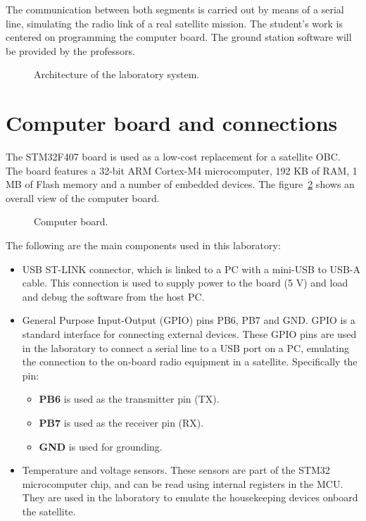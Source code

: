 The communication between both segments is carried out by means of a serial line,
simulating the radio link of a real satellite mission.
The student's work is centered on programming the computer board.
The ground station software will be provided by the professors.

\begin{figure}[hbtp!]
            \caption{Architecture of the laboratory system.}
            \label{fig:architecture}
\end{figure}

\section*{Computer board and connections}

The STM32F407 board is used as a low-cost replacement for a satellite OBC.
The board features a 32-bit ARM Cortex-M4 microcomputer,
192 KB of RAM, 1 MB of Flash memory and a number of embedded devices.
The figure~\ref{fig:board}
shows an overall view of the computer board.

\begin{figure}[hbtp!]
    \caption{Computer board.}
    \label{fig:board}
\end{figure}

The following are the main components used in this laboratory:
\begin{itemize}
\item	USB ST-LINK connector, which is linked to a PC with a mini-USB to USB-A cable. This connection is used to supply power to the board (5 V) and load and debug the software from the host PC.

\item	General Purpose Input-Output (GPIO) pins PB6, PB7 and GND.
GPIO is a standard interface for connecting external devices.
These GPIO pins are used in the laboratory
to connect a serial line to a USB port on a PC,
emulating the connection to the on-board radio equipment in a satellite.
Specifically the pin:
\begin{itemize}
	\item \textbf{PB6} is used as the transmitter pin (TX).
	\item \textbf{PB7} is used as the receiver pin (RX).
	\item \textbf{GND} is used for grounding.
\end{itemize}

\item	Temperature and voltage sensors. These sensors are part of the STM32 microcomputer chip,
and can be read using internal registers in the MCU.
They are used in the laboratory to emulate the housekeeping devices onboard the satellite.
\end{itemize}
